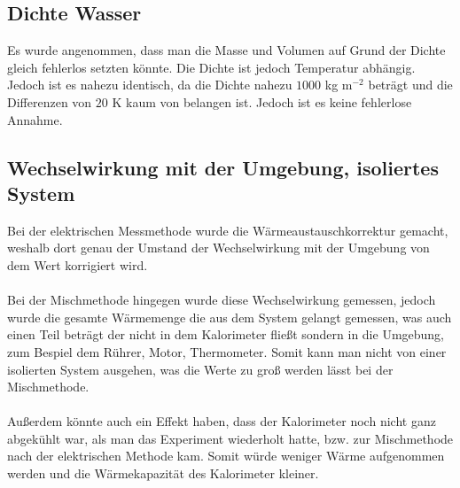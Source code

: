 \documentclass[bibliography=totocnumbered]{scrartcl}
\begin{document}
		 \subsection{Dichte Wasser}
		Es wurde angenommen, dass man die Masse und Volumen auf Grund der Dichte gleich fehlerlos
		setzten könnte. Die Dichte ist jedoch Temperatur abhängig. Jedoch ist es nahezu identisch, da die
		Dichte nahezu $ 1000 $ kg m$ ^{-2} $ beträgt und die Differenzen von $ 20 $ K kaum von belangen ist. Jedoch ist
		es keine fehlerlose Annahme. 
		\subsection{ Wechselwirkung mit der Umgebung, isoliertes System}
		Bei der elektrischen Messmethode wurde die Wärmeaustauschkorrektur gemacht, weshalb dort
		genau der Umstand der Wechselwirkung mit der Umgebung von dem Wert korrigiert wird.\\\\ Bei der Mischmethode hingegen wurde diese Wechselwirkung gemessen, jedoch wurde die gesamte
		Wärmemenge die aus dem System gelangt gemessen, was auch einen Teil beträgt der nicht in dem
		Kalorimeter fließt sondern in die Umgebung, zum Bespiel dem Rührer, Motor, Thermometer. Somit
		kann man nicht von einer isolierten System ausgehen, was die Werte zu groß werden lässt bei der
		Mischmethode.\\\\Außerdem könnte auch ein Effekt haben, dass der Kalorimeter noch nicht ganz abgekühlt war, als
		man das Experiment wiederholt hatte, bzw. zur Mischmethode nach der elektrischen Methode kam.
		Somit würde weniger Wärme aufgenommen werden und die Wärmekapazität des Kalorimeter
		kleiner.

	
	
\end{document}
